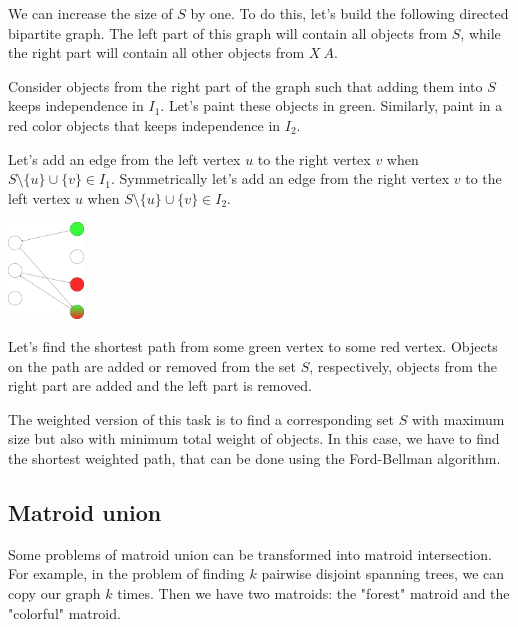 We can increase the size of $S$ by one. To do this, let’s build the following directed bipartite graph. 
The left part of this graph will contain all objects from $S$, while the right part will contain all other objects from $X \ A$.

Consider objects from the right part of the graph such that adding them into $S$ keeps independence in $I_1$. 
Let’s paint these objects in green. Similarly, paint in a red color objects that keeps independence in $I_2$.

Let’s add an edge from the left vertex $u$ to the right vertex $v$ when $S \setminus \{ u \} \cup \{ v \} \in I_1$.
Symmetrically let’s add an edge from the right vertex $v$ to the left vertex $u$ when $S \setminus \{ u \} \cup \{ v \} \in I_2$.

\begin{center}
  \includegraphics[width=0.15\textwidth, center]{content/various/matroid-intersection.png}
\end{center}

Let’s find the shortest path from some green vertex to some red vertex. 
Objects on the path are added or removed from the set $S$, respectively, objects from the right part are added and the left part is removed.

The weighted version of this task is to find a corresponding set $S$ with maximum size but also with minimum total weight of objects.
In this case, we have to find the shortest weighted path, that can be done using the Ford-Bellman algorithm.

\subsection*{Matroid union}

Some problems of matroid union can be transformed into matroid intersection.
For example, in the problem of finding $k$ pairwise disjoint spanning trees, we can copy our graph $k$ times. 
Then we have two matroids: the "forest" matroid and the "colorful" matroid.

